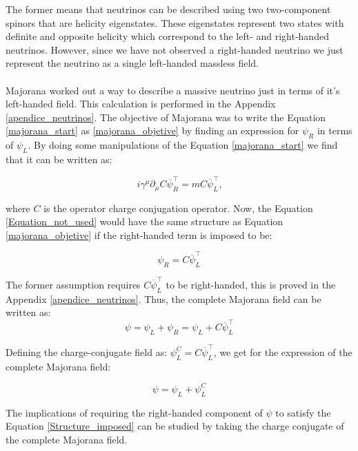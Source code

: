 The former means that neutrinos can be described using two two-component spinors that are helicity eigenstates. These eigenstates represent two states 
with definite and opposite helicity which correspond to the left- and right-handed neutrinos. However, since we have not observed a right-handed neutrino 
we just represent the neutrino as a single left-handed massless field. \cite{Theory_neutrinos} \\
\\
Majorana worked out a way to describe a massive neutrino just in terms of it's left-handed field.
This calculation is performed in the Appendix \ref{apendice_neutrinos}. The objective of Majorana was to write the Equation
\ref{majorana_start} as \ref{majorana_objetive} by finding an expression for $\psi_R$ in terms of $\psi_L$. By doing some manipulations of the Equation \ref{majorana_start} we 
find that it can be written as:  

\begin{equation} \label{Equation_not_used}
i \gamma^\mu \partial_\mu C \overline{\psi}^\intercal_R = m C \overline{\psi}^{\intercal}_L \text{,}
\end{equation}

where $C$ is the operator charge conjugation operator. Now, the Equation \ref{Equation_not_used} would have the same structure
as Equation \ref{majorana_objetive} if the right-handed term is imposed to be:

\begin{equation} 
\label{Expression_right_handed}
\psi_R = C \overline{\psi}^\intercal_L
\end{equation}

The former assumption requires $C \overline{\psi}^\intercal_L$ to be right-handed, this is proved in the Appendix \ref{apendice_neutrinos}. Thus, the complete Majorana 
field can be written as:
\begin{equation}
\psi = \psi_L + \psi_R = \psi_L + C \overline{\psi}^\intercal_L
\end{equation}

Defining the charge-conjugate field as: $\psi^C_L = C \overline{\psi}^\intercal_L$, we get for the expression of the complete Majorana field:

\begin{equation} \label{Structure_imposed}
\psi = \psi_L + \psi^C_L
\end{equation}

The implications of requiring the right-handed component of $\psi$ to satisfy the Equation                                                    \ref{Structure_imposed} can be studied by taking the charge conjugate of the complete Majorana field. 

